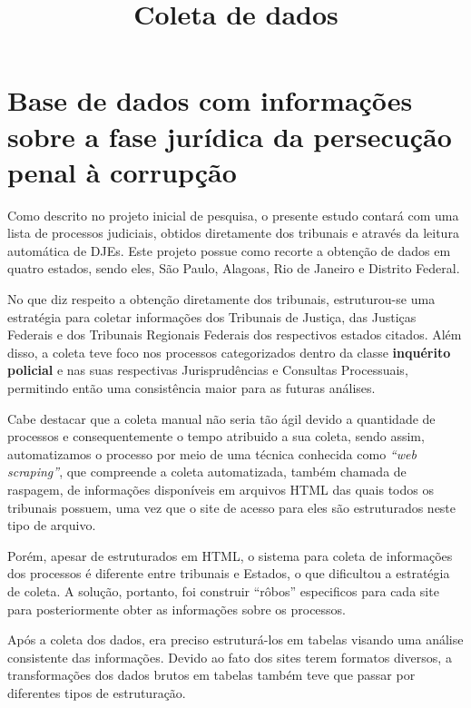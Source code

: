 \documentclass[12pt]{article}
\title{Coleta de dados}
\author{}
\begin{document}
\maketitle

\thispagestyle{fancy}

{
\hypersetup{linkcolor=black}
\setcounter{tocdepth}{2}
\tableofcontents
}
\pagebreak

\section{Base de dados com informações sobre a fase jurídica da
persecução penal à
corrupção}\label{base-de-dados-com-informacoes-sobre-a-fase-juridica-da-persecucao-penal-a-corrupcao}

Como descrito no projeto inicial de pesquisa, o presente estudo contará
com uma lista de processos judiciais, obtidos diretamente dos tribunais
e através da leitura automática de DJEs. Este projeto possue como
recorte a obtenção de dados em quatro estados, sendo eles, São Paulo,
Alagoas, Rio de Janeiro e Distrito Federal.

No que diz respeito a obtenção diretamente dos tribunais, estruturou-se
uma estratégia para coletar informações dos Tribunais de Justiça, das
Justiças Federais e dos Tribunais Regionais Federais dos respectivos
estados citados. Além disso, a coleta teve foco nos processos
categorizados dentro da classe \textbf{inquérito policial} e nas suas
respectivas Jurisprudências e Consultas Processuais, permitindo então
uma consistência maior para as futuras análises.

Cabe destacar que a coleta manual não seria tão ágil devido a quantidade
de processos e consequentemente o tempo atribuido a sua coleta, sendo
assim, automatizamos o processo por meio de uma técnica conhecida como
\emph{``web scraping''}, que compreende a coleta automatizada, também
chamada de raspagem, de informações disponíveis em arquivos HTML das
quais todos os tribunais possuem, uma vez que o site de acesso para eles
são estruturados neste tipo de arquivo.

Porém, apesar de estruturados em HTML, o sistema para coleta de
informações dos processos é diferente entre tribunais e Estados, o que
dificultou a estratégia de coleta. A solução, portanto, foi construir
``rôbos'' especificos para cada site para posteriormente obter as
informações sobre os processos.

Após a coleta dos dados, era preciso estruturá-los em tabelas visando
uma análise consistente das informações. Devido ao fato dos sites terem
formatos diversos, a transformações dos dados brutos em tabelas também
teve que passar por diferentes tipos de estruturação.
\end{document}
